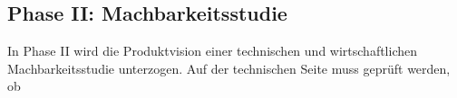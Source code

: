 \subsection{Phase II: Machbarkeitsstudie}
In Phase II wird die Produktvision einer technischen und wirtschaftlichen 
Machbarkeitsstudie unterzogen.
Auf der technischen Seite muss geprüft werden, ob 
\begin{comment}
\subsubsection{Technische Machbarkeit}


\subsubsection{Wirtschaftliche Machbarkeit}
"`In diesem Punkt unterscheidet sich Cloud-Computing von früheren Paradigmen
wie Outsourcing, welches nicht auf das Geschäftsmodell des Unternehmens wirken
will. Durch neue Anwendungsszenarien kann mit Cloud-Computing ein beachtlicher
Mehrwert geschaffen werden."' \pcite{}{154}{cloud_migration}

"`Cloud-Computing verändert die Preisgestaltung von IT-Services und kann als
eine Reaktion  auf das straffere Kostenmanagement im Nachgang der Finanzkrise
2008 verwendet werden. Unternehmenskunden wollen sich nicht mehr mit fixen
IT-Kosten binden. Sie wollen auch in der IT des Unternehmens die Capital
Expenditures (CAPEX) in Operational Expenditures (OPEX) umwandeln. Dies ist der
Hauptgrund, wieso das 'Pay-per-Use-Pricing' von Cloud-Services bei den
 Unternehmen so viel Interesse geweckt hat."' \pcite{}{156}{cloud_migration}


"`Mögliche betriebswirtschaftliche Vorteile: bessere Nutzung des
Ressourcen-Pools des Unternehmens, Verbesserung der Zeit zur Markteinführung
neuer Produkte und Dienstleistungen, Steigerung der Agilität und letztlich
Verbesserung der Erfahrungen der Kunden im Umgang mit dem Unternehmen,
welches auf Cloud-Computing setzt."'
\pcite{}{157}{cloud_migration}


"`Alle Empfehlungen sollten mit einem Business Case hinterlegt werden, der
die Höhe der Kostenreduktion und die Verbesserung des Servicelevels zeigt."'
\pcite{}{158}{cloud_migration}

\begin{comment}
\subsection{Phase III: Anforderungsanalyse und -Planung}

\end{comment}

